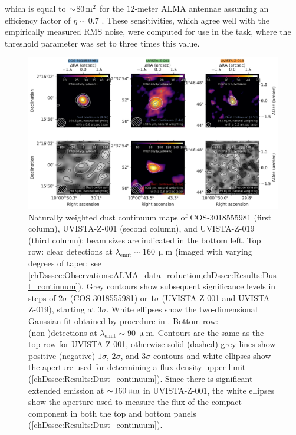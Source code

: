 \noindent which is equal to $\sim \! 80 \, \mathrm{m^2}$ for the $12$-meter ALMA antennae assuming an efficiency factor of $\eta \sim 0.7$ \citep{ALMA_technical_handbook}. These sensitivities, which agree well with the empirically measured RMS noise, were computed for use in the  task, where the threshold parameter was set to three times this value.
\begin{figure}
    \centering
    \includegraphics[width=\linewidth]{"Plots/ChapterD/Dust_maps_clean_COS-3018555981_UVISTA-Z-001_UVISTA-Z-019"}
    \caption[Naturally weighted dust continuum maps of COS-3018555981, UVISTA-Z-001, and UVISTA-Z-019.]{Naturally weighted dust continuum maps of COS-3018555981 (first column), UVISTA-Z-001 (second column), and UVISTA-Z-019 (third column); beam sizes are indicated in the bottom left. Top row: clear detections at $\lambda_\text{emit} \sim 160 \, \mathrm{\upmu m}$ (imaged with varying degrees of taper; see \cref{chDsssec:Observations:ALMA_data_reduction,chDssec:Results:Dust_continuum}). Grey contours show subsequent significance levels in steps of $2 \sigma$ (COS-3018555981) or $1 \sigma$ (UVISTA-Z-001 and UVISTA-Z-019), starting at $3 \sigma$. White ellipses show the two-dimensional Gaussian fit obtained by  procedure in . Bottom row: (non-)detections at $\lambda_\text{emit} \sim 90 \, \mathrm{\upmu m}$. Contours are the same as the top row for UVISTA-Z-001, otherwise solid (dashed) grey lines show positive (negative) $1 \sigma$, $2 \sigma$, and $3 \sigma$ contours and white ellipses show the aperture used for determining a flux density upper limit (\cref{chDssec:Results:Dust_continuum}). Since there is significant extended emission at $\sim \! 160 \, \mathrm{\upmu m}$ in UVISTA-Z-001, the white ellipses show the aperture used to measure the flux of the compact component in both the top and bottom panels (\cref{chDssec:Results:Dust_continuum}).
    }
    \label{chDfig:Dust_continuum_maps}
\end{figure}

